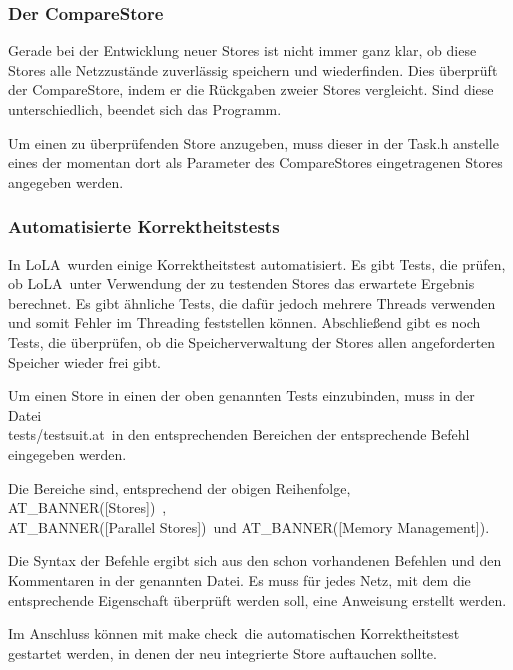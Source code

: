 \documentclass[12pt,a4paper,titlepage]{scrartcl}
\renewcommand \( {\left (}
\renewcommand \) {\right )}
\renewcommand \[ {\left [}
\renewcommand \] {\right ]}
\newcommand \Flqq {\flqq\ }
\newcommand{\lola}{\frqq LoLA\Flqq}
\begin{document}
\subsubsection{Der CompareStore}
\label{kap:CompareStore}
Gerade bei der Entwicklung neuer Stores ist nicht immer ganz klar, ob diese Stores alle Netzzustände zuverlässig speichern und wiederfinden. Dies überprüft der CompareStore, indem er die Rückgaben zweier Stores vergleicht. Sind diese unterschiedlich, beendet sich das Programm.

Um einen zu überprüfenden Store anzugeben, muss dieser in der Task.h anstelle eines der momentan dort als Parameter des CompareStores eingetragenen Stores angegeben werden.

\subsubsection{Automatisierte Korrektheitstests}
In \lola wurden einige Korrektheitstest automatisiert. Es gibt Tests, die prüfen, ob \lola unter Verwendung der zu testenden Stores das erwartete Ergebnis berechnet. Es gibt ähnliche Tests, die dafür jedoch mehrere Threads verwenden und somit Fehler im Threading feststellen können. Abschließend gibt es noch Tests, die überprüfen, ob die Speicherverwaltung der Stores allen angeforderten Speicher wieder frei gibt.

Um einen Store in einen der oben genannten Tests einzubinden, muss in der Datei
\\\frqq tests/testsuit.at\Flqq in den entsprechenden Bereichen der entsprechende Befehl eingegeben werden.

Die Bereiche sind, entsprechend der obigen Reihenfolge, \frqq AT\_BANNER([Stores])\Flqq,\\\frqq AT\_BANNER([Parallel Stores])\Flqq und \frqq AT\_BANNER([Memory Management])\flqq.

Die Syntax der Befehle ergibt sich aus den schon vorhandenen Befehlen und den Kommentaren in der genannten Datei. Es muss für jedes Netz, mit dem die entsprechende Eigenschaft überprüft werden soll, eine Anweisung erstellt werden.

Im Anschluss können mit \frqq make check\Flqq die automatischen Korrektheitstest gestartet werden, in denen der neu integrierte Store auftauchen sollte.
\end{document}
